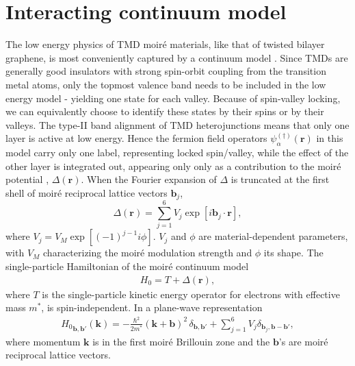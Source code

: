 \documentclass[%
 reprint,
 superscriptaddress,
 amsmath,amssymb,
 aps,
 prx,
 floatfix,
]{revtex4-2}
\newcommand{\<}{\langle}
\renewcommand{\>}{\rangle}
\renewcommand{\(}{\left(}
\renewcommand{\)}{\right)}
\renewcommand{\[}{\left[}
\renewcommand{\]}{\right]}
\renewcommand{\b}[1]{\mathbf{#1}} %
\begin{document}
\section{\label{sec:hf}Interacting continuum model}
The low energy physics of TMD moir\'e materials, like that of twisted bilayer graphene, is most conveniently captured by a continuum model \cite{fengchengHubbard}. Since TMDs are generally good insulators with strong spin-orbit coupling
from the transition metal atoms, only the topmost valence band needs to be included in the low energy model - yielding one 
state for each valley.  Because of spin-valley locking, we can equivalently choose to 
identify these states by their spins or by their valleys.  
The type-II band alignment of TMD heterojunctions means that 
only one layer is active at low energy.  
Hence the fermion field operators $\psi^{(\dag)}_{\alpha}(\b r)$ in this model carry only one label, 
representing locked spin/valley, while the effect of the other layer is integrated 
out, appearing only only as a contribution to the moir\'e potential \cite{fengchengDelta,fengchengHubbard},
$\Delta(\bm{r})$.
When the Fourier expansion of $\Delta$ is truncated at the first shell of 
moir\'e reciprocal lattice vectors $\mathbf{b}_j$,
\begin{equation}
\Delta(\mathbf{r}) = \sum_{j=1}^6 V_j \exp\[i\mathbf{b}_j\cdot\mathbf{r}\],
\end{equation}
where $V_j = V_M\exp\[(-1)^{j-1}i\phi\]$.  $V_j$ and $\phi$ are material-dependent parameters, with 
$V_M$ characterizing the moir\'e modulation strength and $\phi$ its shape.
The single-particle Hamiltonian of the moir\'e continuum model 
\begin{align}
    H_{0} = T + \Delta(\mathbf{r}),\label{eq:model}
\end{align}
where $T$ is the single-particle kinetic energy operator for electrons with effective mass $m^*$,
is spin-independent.  In a plane-wave representation
\begin{align}
    {H_{0}}_{\b{b},\b{b}'}(\b{k}) 
    = -\frac{\hbar^2}{2m^*}\(\b{k}+\b{b}\)^2 \, \delta_{\b{b},\b{b}'} + \sum_{j=1}^6 V_j\delta_{\b{b}_j,\b{b}-\b{b}'},
\end{align}
where momentum $\b{k}$ is in the first moir\'e Brillouin zone and the $\b{b}$'s are moir\'e reciprocal lattice vectors.
\end{document}
